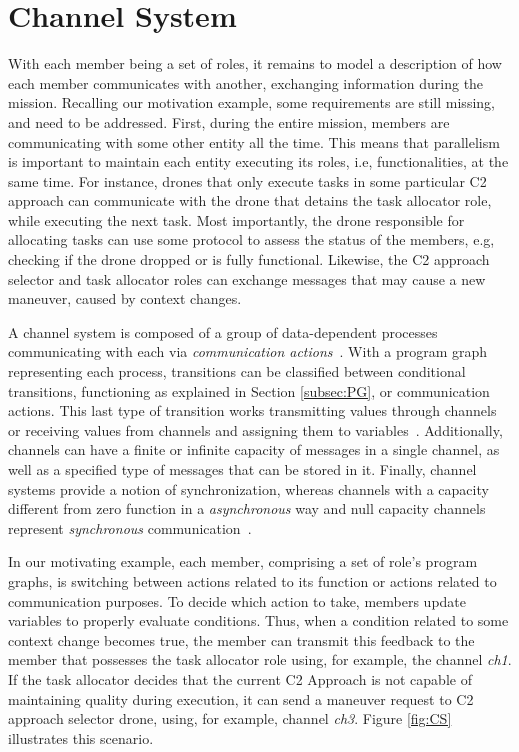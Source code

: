 \section{Channel System}
\label{sec:channelSystem}

With each member being a set of roles, it remains to model a description of how each member communicates with another, exchanging information during the mission. Recalling our motivation example, some requirements are still missing, and need to be addressed. First, during the entire mission, members are communicating with some other entity all the time. This means that parallelism is important to maintain each entity executing its roles, i.e, functionalities, at the same time. For instance, drones that only execute tasks in some particular C2 approach can communicate with the drone that detains the task allocator role, while executing the next task. Most importantly, the drone responsible for allocating tasks can use some protocol to assess the status of the members, e.g, checking if the drone dropped or is fully functional. Likewise, the C2 approach selector and task allocator roles can exchange messages that may cause a new maneuver, caused by context changes.

A channel system is composed of a group of data-dependent processes communicating with each via \textit{communication actions}~\cite{modelcheckingBaier}. With a program graph representing each process, transitions can be classified between conditional transitions, functioning as explained in Section \ref{subsec:PG}, or communication actions. This last type of transition works transmitting values through channels or receiving values from channels and assigning them to variables~\cite{modelcheckingBaier}. Additionally, channels can have a finite or infinite capacity of messages in a single channel, as well as a specified type of messages that can be stored in it. Finally, channel systems provide a notion of synchronization, whereas channels with a capacity different from zero function in a \textit{asynchronous} way and null capacity channels represent \textit{synchronous} communication~\cite{modelcheckingBaier}.

In our motivating example, each member, comprising a set of role's program graphs, is switching between actions related to its function or actions related to communication purposes. To decide which action to take, members update variables to properly evaluate conditions. Thus, when a condition related to some context change becomes true, the member can transmit this feedback to the member that possesses the task allocator role using, for example, the channel \textit{ch1}. If the task allocator decides that the current C2 Approach is not capable of maintaining quality during execution, it can send a maneuver request to C2 approach selector drone, using, for example, channel \textit{ch3}. Figure \ref{fig:CS} illustrates this scenario.


